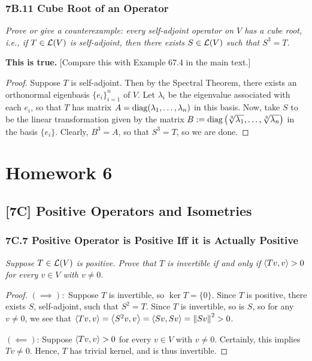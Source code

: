 \documentclass{article}
\begin{document}
\subsubsection*{7B.11 Cube Root of an Operator}
\textit{Prove or give a counterexample: every self-adjoint operator on $V$ has a cube root, i.e., if $T\in\mathcal L(V)$ is self-adjoint, then there exists $S\in\mathcal L(V)$ such that $S^3 = T$.}

\begin{solution}
\textbf{This is true.} [Compare this with Example 67.4 in the main text.]
\end{solution}
\begin{proof}
Suppose $T$ is self-adjoint. Then by the Spectral Theorem, there exists an orthonormal eigenbasis $\{e_i\}_{i=1}^n$ of $V$. Let $\lambda_i$ be the eigenvalue associated with each $e_i$, so that $T$ has matrix $A = \operatorname{diag}(\lambda_1, \ldots, \lambda_n)$ in this basis. Now, take $S$ to be the linear transformation given by the matrix $B := \operatorname{diag}\left(\sqrt[3]{\lambda_1}, \ldots, \sqrt[3]{\lambda_n} \right)$ in the basis $\{e_i\}$. Clearly, $B^3 = A$, so that $S^3 = T$, so we are done.
\end{proof}
\section*{Homework 6}
\subsection*{[7C] Positive Operators and Isometries}
\subsubsection*{7C.7 Positive Operator is Positive Iff it is Actually Positive}
\textit{Suppose $T\in\mathcal L(V)$ is positive. Prove that $T$ is invertible if and only if $\left\langle Tv, v\right\rangle >0$ for every $v\in V$ with $v\neq 0$.}
\begin{proof}
$(\implies):$ Suppose $T$ is invertible, so $\ker T = \{0\}$. Since $T$ is positive, there exists $S$, self-adjoint, such that $S^2 = T$. Since $T$ is invertible, so is $S$, so for any $v\neq 0$, we see that $\left\langle Tv, v\right\rangle = \left\langle S^2v, v\right\rangle = \left\langle Sv, Sv\right\rangle = \left\Vert Sv\right\Vert^2 > 0$.

$(\impliedby)$: Suppose $\left\langle Tv, v\right\rangle > 0$ for every $v\in V$ with $v\neq 0$. Certainly, this implies $Tv \neq 0$. Hence, $T$ has trivial kernel, and is thus invertible.
\end{proof}
\end{document}
